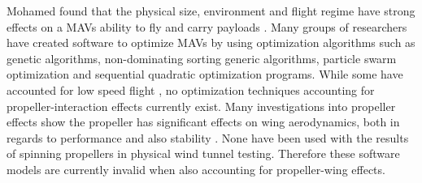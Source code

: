 Mohamed found that the physical size, environment and flight regime have strong effects on a MAVs ability to fly and carry payloads \cite{Mohamed2014}. Many groups of researchers have created software to optimize MAVs by using optimization algorithms such as genetic algorithms, non-dominating sorting generic algorithms, particle swarm optimization and sequential quadratic optimization programs. While some have accounted for low speed flight \cite{Vijayanandh2019} \cite{Bronz2009} \cite{HASSANALIAN2019}, no optimization techniques accounting for propeller-interaction effects currently exist. Many investigations into propeller effects show the propeller has significant effects on wing aerodynamics, both in regards to performance and also stability \cite{Parga2007} \cite{Jana2020}. None have been used with the results of spinning propellers in physical wind tunnel testing. Therefore these software models are currently invalid when also accounting for propeller-wing effects.


